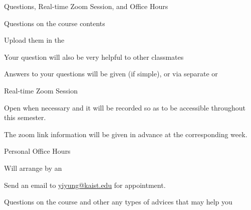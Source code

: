 \begin{frame}{Questions, Real-time Zoom Session, and Office Hours}

\plitemsep 0.05in

  \bci
\item<1-> Questions on the course contents
  \bci
\item Upload them in the 
\item Your question will also be very helpful to other classmates 
\item Answers to your questions will be given  (if simple), or via
  separate  or    
  \eci

\item<2-> Real-time Zoom Session
\bci
\item Open when necessary and it will be recorded so as to be
  accessible throughout this semester. 
\item The zoom link information will be given in advance at the
  corresponding week.   
  \eci

\item<3-> Personal Office Hours
  \bci
\item Will arrange by an  
\item Send an email to \url{yiyung@kaist.edu} for appointment. 
\item Questions on the course and other any types of advices
  that may help you

  \eci
  \eci

\end{frame}








